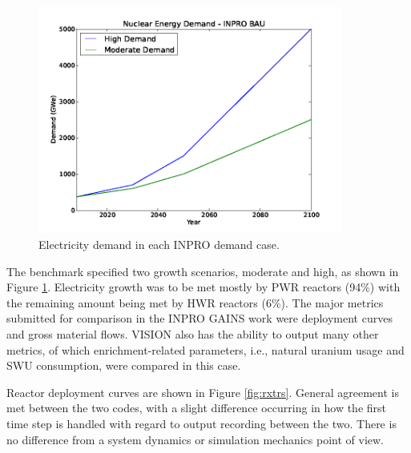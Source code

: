 \begin{figure}[ht]
  \includegraphics[height=7.5cm]{./chapters/prevwork/graphs/inpro-demand.png}
  \caption{Electricity demand in each INPRO demand case.}
  \label{fig:inpro-demand}
\end{figure}

The benchmark specified two growth scenarios, moderate and high, as shown in
Figure \ref{fig:inpro-demand}. Electricity growth was to be met mostly by PWR
reactors (94\%) with the remaining amount being met by HWR reactors (6\%). The
major metrics submitted for comparison in the INPRO GAINS work were deployment
curves and gross material flows. VISION also has the ability to output many
other metrics, of which enrichment-related parameters, i.e., natural uranium
usage and SWU consumption, were compared in this case.

Reactor deployment curves are shown in Figure \ref{fig:rxtrs}. General agreement
is met between the two codes, with a slight difference occurring in how the first
time step is handled with regard to output recording between the two. There is
no difference from a system dynamics or simulation mechanics point of view. 

